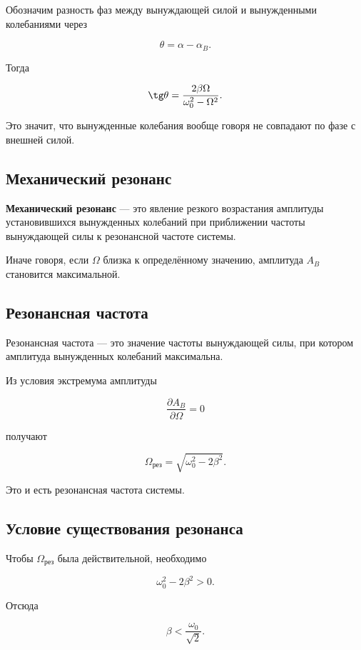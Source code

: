 \documentclass[a4paper,12pt]{article}
\begin{document}
Обозначим разность фаз между вынуждающей силой и вынужденными колебаниями через

\[
\theta=\alpha-\alpha_{B}.
\]

Тогда

\[
\tg\theta=\frac{2\beta\Omega}{\omega_0^2-\Omega^2}.
\]

Это значит, что вынужденные колебания вообще говоря не совпадают по фазе с внешней силой.

\subsection*{Механический резонанс}

\begin{definitionbox}
\textbf{Механический резонанс} — это явление резкого возрастания амплитуды установившихся вынужденных колебаний при приближении частоты вынуждающей силы к резонансной частоте системы.
\end{definitionbox}

Иначе говоря, если $\Omega$ близка к определённому значению, амплитуда $A_{B}$ становится максимальной.

\subsection*{Резонансная частота}

\begin{definitionbox}
Резонансная частота — это значение частоты вынуждающей силы, при котором амплитуда вынужденных колебаний максимальна.
\end{definitionbox}

Из условия экстремума амплитуды

\[
\frac{\partial A_{B}}{\partial \Omega}=0
\]

получают

\[
\Omega_{\text{рез}}=\sqrt{\omega_0^2-2\beta^2}.
\]

Это и есть резонансная частота системы.

\subsection*{Условие существования резонанса}

Чтобы $\Omega_{\text{рез}}$ была действительной, необходимо

\[
\omega_0^2-2\beta^2>0.
\]

Отсюда

\[
\beta<\frac{\omega_0}{\sqrt{2}}.
\]
\end{document}
